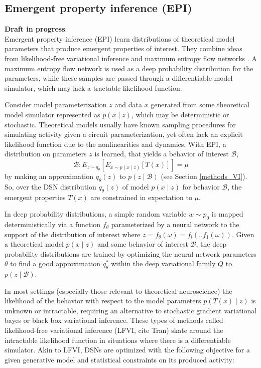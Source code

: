 \documentclass[11pt]{article}
\begin{document}
\subsection{Emergent property inference (EPI)}\label{methods_EPI}
\textbf{Draft in progress}: \\
Emergent property inference (EPI) learn distributions of theoretical model parameters that produce emergent properties of interest.  They combine ideas from likelihood-free variational inference \cite{tran2017hierarchical} and maximum entropy flow networks \cite{loaiza2017maximum}.  A maximum entropy flow network is used as a deep probability distribution for the parameters, while these samples are passed through a differentiable model simulator, which may lack a tractable likelihood function.

Consider model parameterization $z$ and data $x$ generated from some theoretical model simulator represented as $p(x \mid z)$, which may be deterministic or stochastic.  Theoretical models usually have known sampling procedures for simulating activity given a circuit parameterization, yet often lack an explicit likelihood function due to the nonlinearities and dynamics. With EPI, a distribution on parameters $z$ is learned, that yields a behavior of interest $\mathcal{B}$,
\begin{equation}
\mathcal{B}: E_{z \sim q_\theta}\left[ E_{x\sim p(x \mid z)}\left[T(x)\right] \right] = \mu
\end{equation}
by making an approximation $q_\theta(z)$ to $p(z \mid \mathcal{B})$ (see Section \ref{methods_VI}).  So, over the DSN distribution $q_\theta(z)$ of model $p(x \mid z)$ for behavior $\mathcal{B}$, the emergent properties $T(x)$ are constrained in expectation to $\mu$.

 In deep probability distributions, a simple random variable $w \sim p_0$ is mapped deterministically via a function $f_\theta$ parameterized by a neural network to the support of the distribution of interest where $z = f_{\theta}(\omega) = f_l(..f_1(\omega))$.  Given a theoretical model $p(x \mid z)$ and some behavior of interest $\mathcal{B}$, the deep probability distributions are trained by optimizing the neural network parameters $\theta$ to find a good approximation $q_{\theta}^*$ within the deep variational family $Q$ to $p(z \mid \mathcal{B})$.

In most settings (especially those relevant to theoretical neuroscience) the likelihood of the behavior with respect to the model parameters $p(T(x) \mid z)$ is unknown or intractable, requiring an alternative to stochastic gradient variational bayes \cite{kingma2013auto} or black box variational inference\cite{ranganath2014black}.  These types of methods called likelihood-free variational inference (LFVI, cite Tran) skate around the intractable likelihood function in situations where there is a differentiable simulator. Akin to LFVI, DSNs are optimized with the following objective for a given generative model and statistical constraints on its produced activity:
\end{document}
